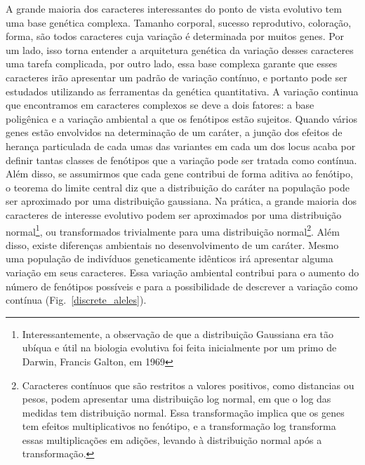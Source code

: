 \begin{refsection}
A grande maioria dos caracteres interessantes do ponto de vista evolutivo tem
uma base genética complexa. Tamanho corporal, sucesso reprodutivo, coloração,
forma, são todos caracteres cuja variação é determinada por muitos genes. Por
um lado, isso torna entender a arquitetura genética da variação desses
caracteres uma tarefa complicada, por outro lado, essa base complexa garante
que esses caracteres irão apresentar um padrão de variação contínuo, e
portanto pode ser estudados utilizando as ferramentas da genética
quantitativa. A variação continua que encontramos em caracteres complexos se
deve a dois fatores: a base poligênica e a variação ambiental a que os
fenótipos estão sujeitos. Quando vários genes estão envolvidos na determinação
de um caráter, a junção dos efeitos de herança particulada de cada umas das
variantes em cada um dos locus acaba por definir tantas classes de fenótipos
que a variação pode ser tratada como contínua. Além disso, se assumirmos que
cada gene contribui de forma aditiva ao fenótipo, o teorema do limite central
diz que a distribuição do caráter na população pode ser aproximado por uma
distribuição gaussiana. Na prática, a grande maioria dos caracteres de
interesse evolutivo podem ser aproximados por uma distribuição
normal\footnote{Interessantemente, a observação de que a distribuição
Gaussiana era tão ubíqua e útil na biologia evolutiva foi feita inicialmente
por um primo de Darwin, Francis Galton, em 1969}, ou transformados
trivialmente para uma distribuição normal\footnote{Caracteres contínuos que
são restritos a valores positivos, como distancias ou pesos, podem apresentar
uma distribuição log normal, em que o log das medidas tem distribuição normal.
Essa transformação implica que os genes tem efeitos multiplicativos no
fenótipo, e a transformação log transforma essas multiplicações em adições,
levando à distribuição normal após a transformação.}. Além disso, existe
diferenças ambientais no desenvolvimento de um caráter. Mesmo uma população de
indivíduos geneticamente idênticos irá apresentar alguma variação em seus
caracteres. Essa variação ambiental contribui para o aumento do número de
fenótipos possíveis e para a possibilidade de descrever a variação como
contínua (Fig.~\ref{discrete_aleles}).


\end{refsection}
